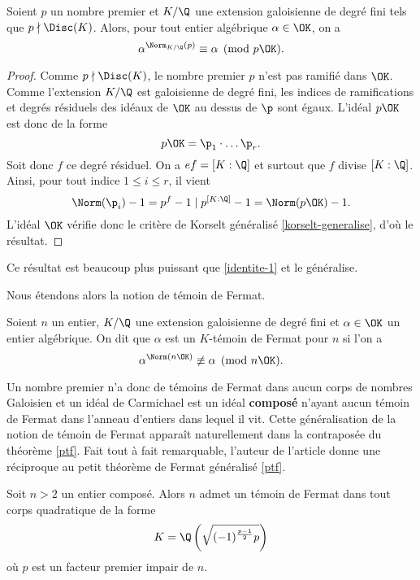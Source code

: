 \begin{theoreme}\label{ptf}
	Soient $p$ un nombre premier et $K/\Q$ une extension galoisienne de degré fini tels que $p\nmid \Disc(K)$. Alors, pour tout entier algébrique $\alpha \in \OK$, on a $$\alpha^{\Norm_{K/\Q}(p)} \equiv \alpha \pmod{p\OK}.$$
\end{theoreme}

\begin{proof}
	Comme $p\nmid \Disc(K)$, le nombre premier $p$ n'est pas ramifié dans $\OK$. Comme l'extension $K/\Q$ est galoisienne de degré fini, les indices de ramifications et degrés résiduels des idéaux de $\OK$ au dessus de $\p$ sont égaux. L'idéal $p\OK$ est donc de la forme \[p\OK = \p_1\cdot \dots \p_r.\] Soit donc $f$ ce degré résiduel. On a $ef = [K : \Q]$ et surtout que $f$ divise $[ K : \Q ]$. Ainsi, pour tout indice $1\leq i \leq r$, il vient \[ \Norm(\p_i) - 1 = p^f - 1 \mid p^{[K : \Q]} - 1 = \Norm(p\OK) - 1.\] L'idéal $\OK$ vérifie donc le critère de Korselt généralisé \ref{korselt-generalise}, d'où le résultat.
\end{proof}

\begin{remarque}
	Ce résultat est beaucoup plus puissant que \ref{identite-1} et le généralise.
\end{remarque}

Nous étendons alors la notion de témoin de Fermat.

\begin{definition}
	Soient $n$ un entier, $K/\Q$ une extension galoisienne de degré fini et $\alpha\in \OK$ un entier algébrique. On dit que $\alpha$ est un $K$-témoin de Fermat pour $n$ si l'on a \[\alpha^{\Norm(n\OK)} \not \equiv \alpha \pmod{n\OK}.\]
\end{definition}

Un nombre premier n'a donc de témoins de Fermat dans aucun corps de nombres Galoisien et un idéal de Carmichael est un idéal \textbf{composé} n'ayant aucun témoin de Fermat dans l'anneau d'entiers dans lequel il vit. Cette généralisation de la notion de témoin de Fermat apparaît naturellement dans la contraposée du théorème \ref{ptf}. Fait tout à fait remarquable, l'auteur de l'article donne une réciproque au petit théorème de Fermat généralisé \ref{ptf}.

\begin{theoreme}\label{ptf-reciproque}
	Soit $n>2$ un entier composé. Alors $n$ admet un témoin de Fermat dans tout corps quadratique de la forme \[K = \Q\left(\sqrt{(-1)^{\frac{p-1}{2}}p}\right)\] où $p$ est un facteur premier impair de $n$.
\end{theoreme}

